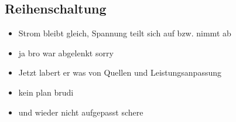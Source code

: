 \documentclass[a4paper,12pt]{article}
\begin{document}
\subsection*{Reihenschaltung}

\begin{itemize}
    \item Strom bleibt gleich, Spannung teilt sich auf bzw. nimmt ab 
    \item ja bro war abgelenkt sorry
    \item Jetzt labert er was von Quellen und Leistungsanpassung
    \item kein plan brudi
    \item und wieder nicht aufgepasst schere
\end{itemize}
\end{document}
